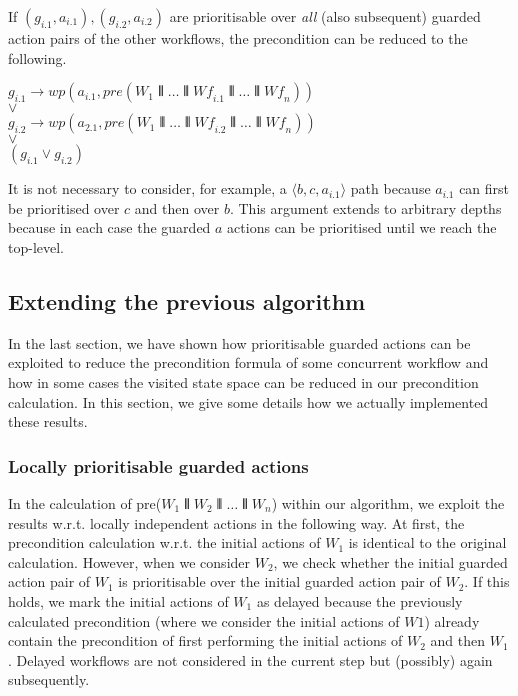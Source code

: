 \documentclass[11pt]{article}
\newcommand{\Wf}{\mathit{Wf}}
\begin{document}
\noindent
If $(g_{i.1} , a_{i.1}), (g_{i.2} , a_{i.2})$ are prioritisable over \textit{all} (also subsequent) guarded action pairs of the other workflows, the precondition can be reduced to the following. 

\noindent
$g_{i.1} \longrightarrow wp(a_{i.1}, pre(W_1 \interleave \dots \interleave \Wf_{i.1} \interleave \dots \interleave \Wf_n))$ \\
$\lor$ \\
$g_{i.2} \longrightarrow wp(a_{2.1}, pre(W_1 \interleave \dots \interleave \Wf_{i.2} \interleave \dots \interleave \Wf_n))$ \\
$\lor$ \\
$(g_{i.1} \lor g_{i.2})$

It is not necessary to consider, for example, a $\langle b,c,a_{i.1}\rangle$ path because $a_{i.1}$ can first be prioritised over $c$ and then over $b$. This argument extends to arbitrary depths because in each case the guarded $a$ actions can be prioritised until we reach the top-level. 


\subsection{Extending the previous algorithm}

In the last section, we have shown how prioritisable guarded actions can be exploited to reduce the precondition formula of some concurrent workflow and how in some cases the visited state space can be reduced in our precondition calculation. In this section, we give some details how we actually implemented these results. 

\subsubsection{Locally prioritisable guarded actions}

In the calculation of pre($W_1 \interleave W_2 \interleave \dots \interleave W_n$) within our algorithm, we exploit the results w.r.t. locally independent actions in the following way. At first, the precondition calculation w.r.t. the initial actions of $W_1$ is identical to the original calculation. However, when we consider $W_2$, we check whether the initial guarded action pair of $W_1$ is prioritisable over the initial guarded action pair of $W_2$. If this holds, we mark the initial actions of $W_1$ as delayed because the previously calculated precondition (where we consider the initial actions of $W1$) already contain the precondition of first performing the initial actions of $W_2$ and then $W_1$. Delayed workflows are not considered in the current step but (possibly) again subsequently.
\end{document}
